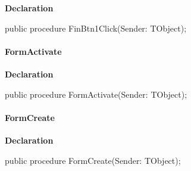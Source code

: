 \documentclass{report}
\newif\ifpdf
\begin{document}
\label{imainunit.TIWizFrm-FinBtn1Click}
\begin{list}{}{
\setlength{\itemindent}{0cm}
\setlength{\listparindent}{0cm}
\setlength{\leftmargin}{\evensidemargin}
\addtolength{\leftmargin}{\tmplength}
\settowidth{\labelsep}{X}
\addtolength{\leftmargin}{\labelsep}
\setlength{\labelwidth}{\tmplength}
}
\item[\textbf{Declaration}\hfill]
\ifpdf
\begin{flushleft}
\fi
\begin{ttfamily}
public procedure FinBtn1Click(Sender: TObject);\end{ttfamily}

\ifpdf
\end{flushleft}
\fi

\end{list}
\paragraph*{FormActivate}\hspace*{\fill}

\label{imainunit.TIWizFrm-FormActivate}
\begin{list}{}{
\setlength{\itemindent}{0cm}
\setlength{\listparindent}{0cm}
\setlength{\leftmargin}{\evensidemargin}
\addtolength{\leftmargin}{\tmplength}
\settowidth{\labelsep}{X}
\addtolength{\leftmargin}{\labelsep}
\setlength{\labelwidth}{\tmplength}
}
\item[\textbf{Declaration}\hfill]
\ifpdf
\begin{flushleft}
\fi
\begin{ttfamily}
public procedure FormActivate(Sender: TObject);\end{ttfamily}

\ifpdf
\end{flushleft}
\fi

\end{list}
\paragraph*{FormCreate}\hspace*{\fill}

\label{imainunit.TIWizFrm-FormCreate}
\begin{list}{}{
\setlength{\itemindent}{0cm}
\setlength{\listparindent}{0cm}
\setlength{\leftmargin}{\evensidemargin}
\addtolength{\leftmargin}{\tmplength}
\settowidth{\labelsep}{X}
\addtolength{\leftmargin}{\labelsep}
\setlength{\labelwidth}{\tmplength}
}
\item[\textbf{Declaration}\hfill]
\ifpdf
\begin{flushleft}
\fi
\begin{ttfamily}
public procedure FormCreate(Sender: TObject);\end{ttfamily}

\ifpdf
\end{flushleft}
\fi

\end{list}
\end{document}
